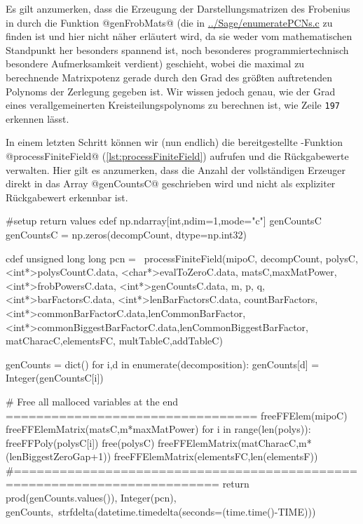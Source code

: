 Es gilt anzumerken, dass die Erzeugung der Darstellungsmatrizen des Frobenius
in \Clang durch die Funktion @genFrobMats@ 
(die in \url{../Sage/enumeratePCNs.c} zu finden ist und hier nicht näher
erläutert wird, da sie weder vom mathematischen Standpunkt her besonders
spannend ist, noch besonderes programmiertechnisch besondere Aufmerksamkeit
verdient)
geschieht, wobei die maximal zu berechnende
Matrixpotenz gerade durch den Grad des größten auftretenden Polynoms der
Zerlegung gegeben ist. Wir wissen jedoch genau, wie der Grad eines
verallgemeinerten Kreisteilungspolynoms zu berechnen ist, wie Zeile
\texttt{197} erkennen lässt.

In einem letzten Schritt können wir (nun endlich) die bereitgestellte
\Clang-Funktion @processFiniteField@ (\autoref{lst:processFiniteField}) 
aufrufen und die Rückgabewerte verwalten. Hier gilt es anzumerken, dass die
Anzahl der vollständigen Erzeuger direkt in das Array @genCountsC@ geschrieben
wird und nicht als expliziter Rückgabewert erkennbar ist.


\begin{sagecode}[caption={\texttt{countCompleteSubmoduleGenerators}
  Fortsetzung (IV)}, 
  firstnumber=241]
    #setup return values
    cdef np.ndarray[int,ndim=1,mode="c"] genCountsC
    genCountsC = np.zeros(decompCount, dtype=np.int32)

    cdef unsigned long long pcn = \
            processFiniteField(mipoC, decompCount,
                    polysC,<int*>polysCountC.data,
                    <char*>evalToZeroC.data,
                    matsC,maxMatPower,<int*>frobPowersC.data,
                    <int*>genCountsC.data, m, p, q,
                    <int*>barFactorsC.data, <int*>lenBarFactorsC.data,
                    countBarFactors,
                    <int*>commonBarFactorC.data,lenCommonBarFactor,
                    <int*>commonBiggestBarFactorC.data,lenCommonBiggestBarFactor,
                    matCharacC,elementsFC,
                    multTableC,addTableC)

    genCounts = dict()
    for i,d in enumerate(decomposition):
        genCounts[d] = Integer(genCountsC[i])

    # Free all malloced variables at the end =================================
    freeFFElem(mipoC)
    freeFFElemMatrix(matsC,m*maxMatPower)
    for i in range(len(polys)):
        freeFFPoly(polysC[i])
    free(polysC)
    freeFFElemMatrix(matCharacC,m*(lenBiggestZeroGap+1))
    freeFFElemMatrix(elementsFC,len(elementsF))
    #=========================================================================
    return prod(genCounts.values()), Integer(pcn), genCounts,\
            strfdelta(datetime.timedelta(seconds=(time.time()-TIME)))
\end{sagecode}

